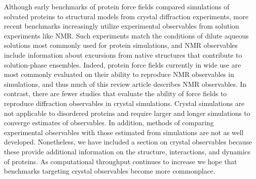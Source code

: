 \documentclass[9pt,review]{livecoms}
\begin{document}
Although early benchmarks of protein force fields compared simulations of solvated proteins to structural models from crystal diffraction experiments, more recent benchmarks increasingly utilize experimental observables from solution experiments like NMR.
Such experiments match the conditions of dilute aqueous solutions most commonly used for protein simulations, and NMR observables include information about excursions from native structures that contribute to solution-phase ensembles.
Indeed, protein force fields currently in wide use are most commonly evaluated on their ability to reproduce NMR observables in simulations, and thus much of this review article describes NMR observables.
In contrast, there are fewer studies that evaluate the ability of force fields to reproduce diffraction observables in crystal simulations.
Crystal simulations are not applicable to disordered proteins and require larger and longer simulations to converge estimates of observables. In addition, methods of comparing experimental observables with those estimated from simulations are not as well developed.
Nonetheless, we have included a section on crystal observables because these provide additional information on the structure, interactions, and dynamics of proteins.
As computational throughput continues to increase we hope that benchmarks targeting crystal observables become more commonplace.
\end{document}
